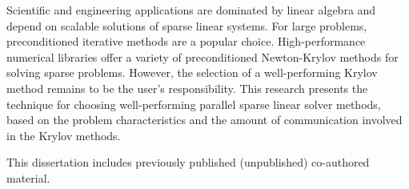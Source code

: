 Scientific and engineering applications are dominated by linear algebra and depend on scalable solutions of sparse linear systems. For large problems, preconditioned iterative methods are a popular choice. High-performance numerical libraries offer a variety of preconditioned Newton-Krylov methods for solving sparse problems. However, the selection of a well-performing Krylov method remains to be the user's responsibility. This research presents the technique for choosing well-performing parallel sparse linear solver methods, based on the problem characteristics and the amount of communication involved in the Krylov methods.

This dissertation includes previously published (unpublished) co-authored material.
